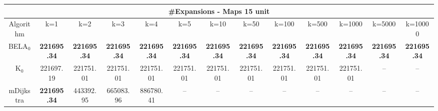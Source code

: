 \begin{tabular}{c|cccccccccccc}\toprule
\multicolumn{13}{c}{#Expansions - Maps 15 unit}\\ \midrule
Algorithm & k=1 & k=2 & k=3 & k=4 & k=5 & k=10 & k=50 & k=100 & k=500 & k=1000 & k=5000 & k=10000 \\ \midrule
BELA$_0$ & \textbf{221695.34} & \textbf{221695.34} & \textbf{221695.34} & \textbf{221695.34} & \textbf{221695.34} & \textbf{221695.34} & \textbf{221695.34} & \textbf{221695.34} & \textbf{221695.34} & \textbf{221695.34} & \textbf{221695.34} & \textbf{221695.34} \\
K$_0$ & 221697.19 & 221751.01 & 221751.01 & 221751.01 & 221751.01 & 221751.01 & 221751.01 & 221751.01 & 221751.01 & 221751.01 & -- & -- \\
mDijkstra & \textbf{221695.34} & 443392.95 & 665083.96 & 886780.41 & -- & -- & -- & -- & -- & -- & -- & -- \\ \bottomrule 
\end{tabular}
